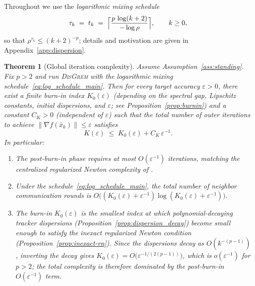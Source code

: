 \documentclass[10pt,twocolumn,letterpaper]{article}
\def\cO{O}%
\theoremstyle{compact}
\newtheorem{theorem}{Theorem}[section]
\theoremstyle{compactremark}
\newcommand{\cO}{\mathcal{O}}
\begin{document}
Throughout we use the \emph{logarithmic mixing schedule}
\begin{equation}\label{eq:log_schedule_main}
  \tau_k \;=\; t_k \;=\; \Bigl\lceil \frac{p\,\log(k+2)}{-\log\rho} \Bigr\rceil,
  \qquad k\ge 0,
\end{equation}
so that $\rho^{\tau_k}\le(k+2)^{-p}$; details and motivation are given in
Appendix~\ref{app:dispersion}.

\begin{theorem}[Global iteration complexity]\label{thm:main}
Assume Assumption~\ref{ass:standing}.
Fix $p>2$ and run \textsc{DisGrem} with the logarithmic mixing schedule~\eqref{eq:log_schedule_main}.
Then for every target accuracy $\varepsilon>0$, there exist a finite burn-in index $K_0(\varepsilon)$
(depending on the spectral gap, Lipschitz constants, initial dispersions, and $\varepsilon$;
see Proposition~\ref{prop:burnin})
and a constant $C_K>0$ (independent of $\varepsilon$) such that the total number of
outer iterations to achieve $\|\nabla f(\bar x_k)\|\le \varepsilon$ satisfies
\[
K(\varepsilon)\;\le\; K_0(\varepsilon) + C_K\,\varepsilon^{-1}.
\]
In particular:
\begin{enumerate}[leftmargin=1.2em,itemsep=2pt]
\item The post-burn-in phase requires at most $\cO(\varepsilon^{-1})$ iterations,
matching the centralized regularized Newton complexity of \citet{mishchenko2023rn}.
\item Under the schedule~\eqref{eq:log_schedule_main}, the total number of neighbor communication rounds is
$\cO\big((K_0(\varepsilon)+\varepsilon^{-1})\log(K_0(\varepsilon)+\varepsilon^{-1})\big)$.
\item The burn-in $K_0(\varepsilon)$ is the smallest index at which
polynomial-decaying tracker dispersions
(Proposition~\ref{prop:dispersion_decay}) become small enough to satisfy the
inexact regularized Newton condition (Proposition~\ref{prop:inexact-rn}).
Since the dispersions decay as $\cO(k^{-(p-1)})$, inverting the decay gives
$K_0(\varepsilon)=\cO\!\bigl(\varepsilon^{-1/(2(p-1))}\bigr)$,
which is $o(\varepsilon^{-1})$ for $p>2$; the total complexity is therefore
dominated by the post-burn-in $\cO(\varepsilon^{-1})$ term.
\end{enumerate}
\end{theorem}
\end{document}
